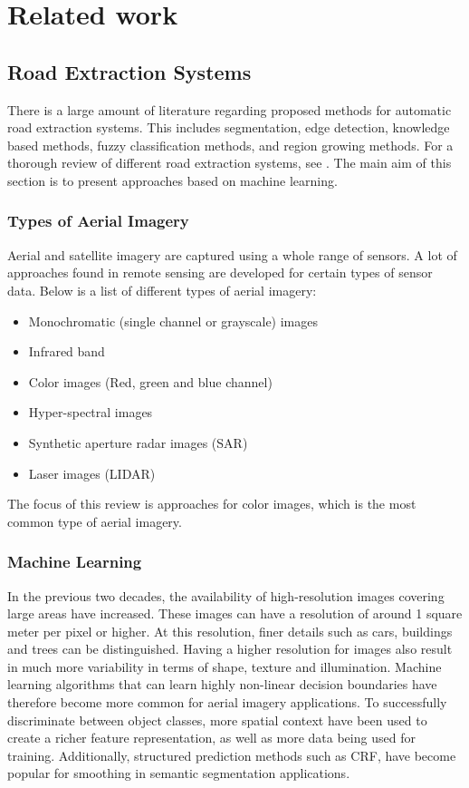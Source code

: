 \section{Related work}
\label{sec:related_works}
\subsection{Road Extraction Systems}
There is a large amount of literature regarding proposed methods for automatic road extraction systems. This includes segmentation, edge detection, knowledge based methods, fuzzy classification methods, and region growing methods. For a thorough review of different road extraction systems, see \citep{Trinder_towards_automation}
\citep{Mena_GIS_state_of_the_art}. The main aim of this section is to present approaches based on machine learning.

\subsubsection{Types of Aerial Imagery}
Aerial and satellite imagery are captured using a whole range of sensors. A lot of approaches found in remote sensing are developed for certain types of sensor data. Below is a list of different types of aerial imagery:
\begin{itemize}
 \item Monochromatic (single channel or grayscale) images 
 \item Infrared band
 \item Color images (Red, green and blue channel)
 \item Hyper-spectral images
 \item Synthetic aperture radar images (SAR)
 \item Laser images (LIDAR)
 \end{itemize}

The focus of this review is approaches for color images, which is the most common type of aerial imagery.

\subsubsection{Machine Learning}
In the previous two decades, the availability of high-resolution images covering large areas have  increased. These images can have a resolution of around 1 square meter per pixel or higher. At this resolution, finer details such as cars, buildings and trees can be distinguished. Having a higher resolution for images also result in much more variability in terms of shape, texture and illumination. Machine learning algorithms that can learn highly non-linear decision boundaries have therefore become more common for aerial imagery applications. To successfully discriminate between object classes, more spatial context have  been used to create a richer feature representation, as well as more data being used for training. Additionally, structured prediction methods such as \ac{CRF}, have become popular for smoothing in semantic segmentation applications.


